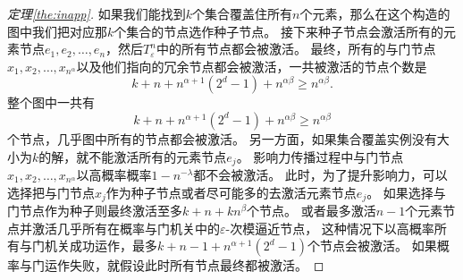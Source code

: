 \begin{proof}[定理\ref{the:inapp}]
如果我们能找到$k$个集合覆盖住所有$n$个元素，那么在这个构造的图中我们把对应那$k$个集合的节点选作种子节点。
接下来种子节点会激活所有的元素节点$e_1, e_2, \dots, e_n$，然后$T_\varepsilon^n$中的所有节点都会被激活。
最终，所有的与门节点$x_1, x_2, \dots, x_{n^\alpha}$以及他们指向的冗余节点都会被激活，一共被激活的节点个数是
$$k+n+n^{\alpha+1}(2^d-1)+n^{\alpha\beta} \geq n^{\alpha\beta}.$$
整个图中一共有
$$k+n+n^{\alpha+1}(2^d-1)+n^{\alpha\beta} \geq n^{\alpha\beta}$$
个节点，几乎图中所有的节点都会被激活。
另一方面，如果集合覆盖实例没有大小为$k$的解，就不能激活所有的元素节点$e_j$。
影响力传播过程中与门节点$x_1, x_2, \dots, x_{n^\alpha}$以高概率概率$1-n^{-\lambda}$都不会被激活。
此时，为了提升影响力，可以选择把与门节点$x_j$作为种子节点或者尽可能多的去激活元素节点$e_j$。
如果选择与门节点作为种子则最终激活至多$k+n+kn^{\beta}$个节点。
或者最多激活$n-1$个元素节点并激活几乎所有在概率与门机关中的$\varepsilon$-次模逼近节点，
这种情况下以高概率所有与门机关成功运作，最多$k+n-1+n^{\alpha+1}(2^d-1)$个节点会被激活。
如果概率与门运作失败，就假设此时所有节点最终都被激活。


\end{proof}

